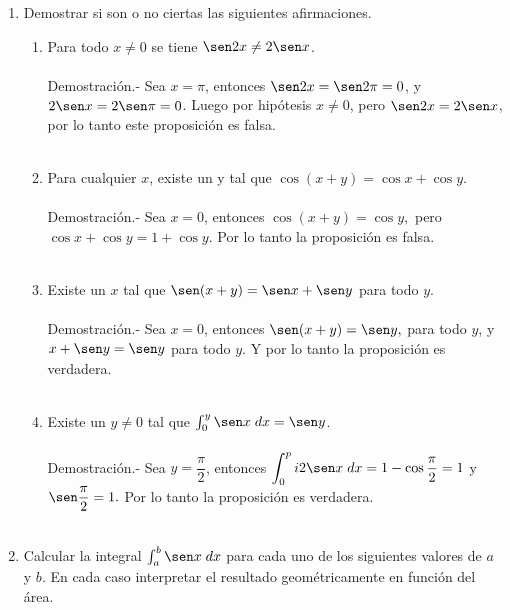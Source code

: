 \begin{enumerate}[\bfseries 1.]
\item Demostrar si son o no ciertas las siguientes afirmaciones.

    \begin{enumerate}[\bfseries (a)]

	\item Para todo $x\neq 0$ se tiene $\sen2x \neq 2\sen x$.\\\\
	    Demostración.-\; Sea $x=\pi$, entonces $\sen 2 x = \sen2\pi = 0$, y $2\sen x = 2\sen \pi = 0$. Luego por hipótesis $x\neq 0$,  pero $\sen2x = 2\sen x$, por lo tanto este proposición es falsa.\\\\

	\item Para cualquier $x$, existe un y tal que $\cos(x+y)=\cos x+\cos y$.\\\\
	    Demostración.-\; Sea $x=0$, entonces $\cos(x+y) = \cos y,$ pero $\cos x +\cos y = 1+\cos y.$ Por lo tanto la proposición es falsa.\\\\

	\item Existe un $x$ tal que $\sen(x+y)=\sen x + \sen y $ para todo $y$.\\\\
	    Demostración.-\; Sea $x=0$, entonces $\sen(x+y) = \sen y,$ para todo $y$, y $x+\sen y =\sen y$ para todo $y.$ Y por lo tanto la proposición es verdadera.\\\\

	\item Existe un $y\neq 0$ tal que $\int_0^y \sen x\; dx = \sen y$.\\\\
	    Demostración.-\; Sea $y=\dfrac{\pi}{2}$, entonces $\displaystyle\int_0^pi 2 \sen x \; dx = 1-\cos\dfrac{\pi}{2}=1$ y $\sen \dfrac{\pi}{2}=1.$ Por lo tanto la proposición es verdadera.\\\\

    \end{enumerate}

\item Calcular la integral $\int_a^b \sen x \; dx$ para cada uno de los siguientes valores de $a$ y $b$. En cada caso interpretar el resultado geométricamente en función del área.


\end{enumerate}
